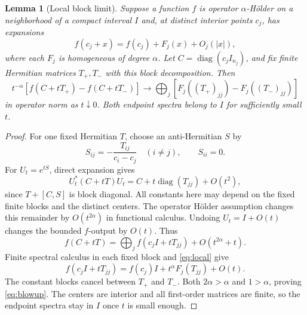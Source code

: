 \documentclass[11pt]{article}
\newtheorem{lemma}[theorem]{Lemma}
\numberwithin{equation}{section}
\newcommand{\diag}{\operatorname{diag}}
\begin{document}
\begin{lemma}[Local block limit]\label{lem:blowup}
Suppose a function $f$ is operator $\alpha$-H\"older on a neighborhood
of a compact interval $I$ and, at distinct interior points $c_j$,
has expansions
\begin{equation}\label{eq:local}
 f(c_j+x)=f(c_j)+F_j(x)+O_j(|x|),
\end{equation}
where each $F_j$ is homogeneous of degree $\alpha$.
Let $C=\diag(c_jI_{n_j})$, and fix finite Hermitian matrices
$T_+,T_-$ with this block decomposition. Then
\begin{equation}\label{eq:blowup}
 t^{-\alpha}[f(C+tT_+)-f(C+tT_-)]
 \longrightarrow
 \bigoplus_j [F_j((T_+)_{jj})-F_j((T_-)_{jj})]
\end{equation}
in operator norm as $t\downarrow0$. Both endpoint spectra belong to
$I$ for sufficiently small $t$.
\end{lemma}
\begin{proof}
For one fixed Hermitian $T$, choose an anti-Hermitian $S$ by
\[
 S_{ij}=-\frac{T_{ij}}{c_i-c_j}\quad(i\ne j),\qquad S_{ii}=0.
\]
For $U_t=e^{tS}$, direct expansion gives
\[
 U_t^*(C+tT)U_t=C+t\diag(T_{jj})+O(t^2),
\]
since $T+[C,S]$ is block diagonal. All constants here may depend on
the fixed finite blocks and the distinct centers.
The operator H\"older assumption changes this remainder by
$O(t^{2\alpha})$ in functional calculus. Undoing $U_t=I+O(t)$
changes the bounded $f$-output by $O(t)$. Thus
\[
 f(C+tT)=\bigoplus_j f(c_jI+tT_{jj})+O(t^{2\alpha}+t).
\]
Finite spectral calculus in each fixed block and \eqref{eq:local}
give
\[
 f(c_jI+tT_{jj})=f(c_j)I+t^\alpha F_j(T_{jj})+O(t).
\]
The constant blocks cancel between $T_+$ and $T_-$. Both
$2\alpha>\alpha$ and $1>\alpha$, proving \eqref{eq:blowup}.
The centers are interior and all first-order matrices are finite, so
the endpoint spectra stay in $I$ once $t$ is small enough.
\end{proof}
\end{document}
